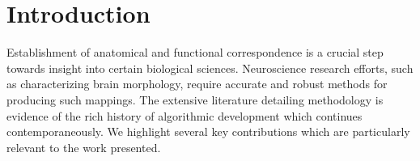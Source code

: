 \documentclass{frontiersSCNS}
\begin{document}
%
%
%







\section{Introduction}

Establishment of anatomical and functional correspondence
is a crucial step towards insight into certain biological 
sciences.  Neuroscience research efforts, such as characterizing 
brain morphology, require accurate and robust methods for
producing such mappings.  The 
extensive literature detailing methodology is evidence of the rich history of 
algorithmic development which continues contemporaneously.
We highlight several key contributions which are particularly relevant to the work presented.
\end{document}
